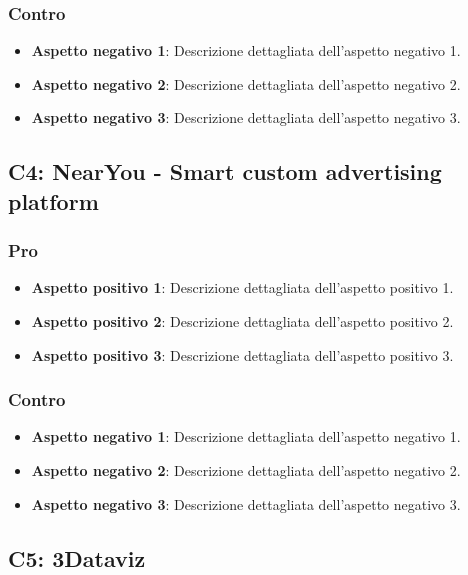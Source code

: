 \subsubsection{Contro}

\begin{itemize}
    \item \textbf{Aspetto negativo 1}: Descrizione dettagliata dell'aspetto negativo 1.
    \item \textbf{Aspetto negativo 2}: Descrizione dettagliata dell'aspetto negativo 2.
    \item \textbf{Aspetto negativo 3}: Descrizione dettagliata dell'aspetto negativo 3.
\end{itemize}


\subsection{C4:	NearYou - Smart custom advertising platform}

\subsubsection{Pro}

\begin{itemize}
    \item \textbf{Aspetto positivo 1}: Descrizione dettagliata dell'aspetto positivo 1.
    \item \textbf{Aspetto positivo 2}: Descrizione dettagliata dell'aspetto positivo 2.
    \item \textbf{Aspetto positivo 3}: Descrizione dettagliata dell'aspetto positivo 3.
\end{itemize}

\subsubsection{Contro}

\begin{itemize}
    \item \textbf{Aspetto negativo 1}: Descrizione dettagliata dell'aspetto negativo 1.
    \item \textbf{Aspetto negativo 2}: Descrizione dettagliata dell'aspetto negativo 2.
    \item \textbf{Aspetto negativo 3}: Descrizione dettagliata dell'aspetto negativo 3.
\end{itemize}


\subsection{C5:	3Dataviz}

